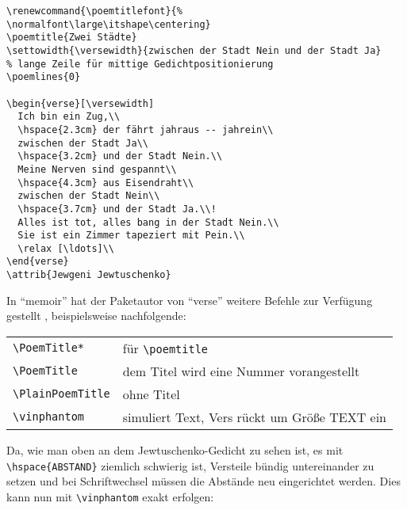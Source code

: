 \begin{lstlisting}
\renewcommand{\poemtitlefont}{%
\normalfont\large\itshape\centering}
\poemtitle{Zwei Städte}
\settowidth{\versewidth}{zwischen der Stadt Nein und der Stadt Ja}
% lange Zeile für mittige Gedichtpositionierung
\poemlines{0}   

\begin{verse}[\versewidth]
  Ich bin ein Zug,\\
  \hspace{2.3cm} der fährt jahraus -- jahrein\\
  zwischen der Stadt Ja\\
  \hspace{3.2cm} und der Stadt Nein.\\
  Meine Nerven sind gespannt\\
  \hspace{4.3cm} aus Eisendraht\\
  zwischen der Stadt Nein\\
  \hspace{3.7cm} und der Stadt Ja.\\!
  Alles ist tot, alles bang in der Stadt Nein.\\
  Sie ist ein Zimmer tapeziert mit Pein.\\
  \relax [\ldots]\\
\end{verse}
\attrib{Jewgeni Jewtuschenko}
\end{lstlisting}


In "`memoir"' hat der Paketautor von "`verse"' weitere Befehle
zur Verfügung gestellt \cite[Kap.\,14]{wilson:memoir}, beispielsweise nachfolgende:

\begin{tabular}{ll}
 \verb|\PoemTitle*| & für  \verb|\poemtitle|\\
 \verb|\PoemTitle|  & dem Titel wird eine Nummer vorangestellt\\
 \verb|\PlainPoemTitle| & ohne Titel \\
\verb|\vinphantom| & simuliert Text, Vers rückt um Größe TEXT ein \\
\end{tabular}

Da, wie man oben an dem Jewtuschenko-Gedicht zu sehen ist, es mit 
\verb|\hspace{ABSTAND}| ziemlich schwierig ist, Versteile bündig untereinander 
zu setzen und bei Schriftwechsel müssen die Abstände neu eingerichtet werden. Dies
kann nun 
mit \verb|\vinphantom| exakt erfolgen:

